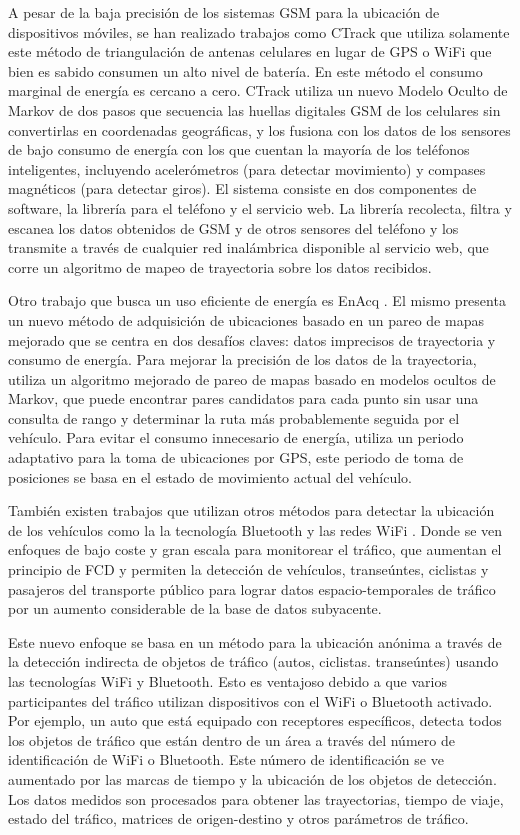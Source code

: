 A pesar de la baja precisión de los sistemas GSM para la ubicación de dispositivos móviles, se han realizado trabajos como CTrack \cite{thiagarajan2011accurate} que utiliza solamente este método de triangulación de antenas celulares en lugar de GPS o WiFi que bien es sabido consumen un alto nivel de batería. En este método el consumo marginal de energía es cercano a cero. CTrack utiliza un nuevo Modelo Oculto de Markov de dos pasos que secuencia las huellas digitales GSM de los celulares sin convertirlas en coordenadas geográficas, y los fusiona con los datos de los sensores de bajo consumo de energía con los que cuentan la mayoría de los teléfonos inteligentes, incluyendo acelerómetros (para detectar movimiento) y compases magnéticos (para detectar giros). El sistema consiste en dos componentes de software, la librería para el teléfono y el servicio web. La librería recolecta, filtra y escanea los datos obtenidos de GSM y de otros sensores del teléfono y los transmite a través de cualquier red inalámbrica disponible al servicio web, que corre un algoritmo de mapeo de trayectoria sobre los datos recibidos.

Otro trabajo que busca un uso eficiente de energía es EnAcq \cite{fang2011enacq}. El mismo presenta un nuevo método de adquisición de ubicaciones basado en un pareo de mapas mejorado que se centra en dos desafíos claves: datos imprecisos de trayectoria y consumo de energía. Para mejorar la precisión de los datos de la trayectoria, utiliza un algoritmo mejorado de pareo de mapas basado en modelos ocultos de Markov, que puede encontrar pares candidatos para cada punto sin usar una consulta de rango y determinar la ruta más probablemente seguida por el vehículo. Para evitar el consumo innecesario de energía, utiliza un periodo adaptativo para la toma de ubicaciones por GPS, este periodo de toma de posiciones se basa en el estado de movimiento actual del vehículo.

También existen trabajos que utilizan otros métodos para detectar la ubicación de los vehículos como la la tecnología Bluetooth y las redes WiFi \cite{ruppe2012augmenting}. Donde se ven enfoques de bajo coste y gran escala para monitorear el tráfico, que aumentan el principio de FCD y permiten la detección de vehículos, transeúntes, ciclistas y pasajeros del transporte público para lograr datos espacio-temporales de tráfico por un aumento considerable de la base de datos subyacente. 

Este nuevo enfoque se basa en un método para la ubicación anónima a través de la detección indirecta de objetos de tráfico (autos, ciclistas. transeúntes) usando las tecnologías WiFi y Bluetooth. Esto es ventajoso debido a que varios participantes del tráfico utilizan dispositivos con el WiFi o Bluetooth activado. Por ejemplo, un auto que está equipado con receptores específicos, detecta todos los objetos de tráfico que están dentro de un área a través del número de identificación de WiFi o Bluetooth. Este número de identificación se ve aumentado por las marcas de tiempo y la ubicación de los objetos de detección. Los datos medidos son procesados para obtener las trayectorias, tiempo de viaje, estado del tráfico, matrices de origen-destino y otros parámetros de tráfico.

